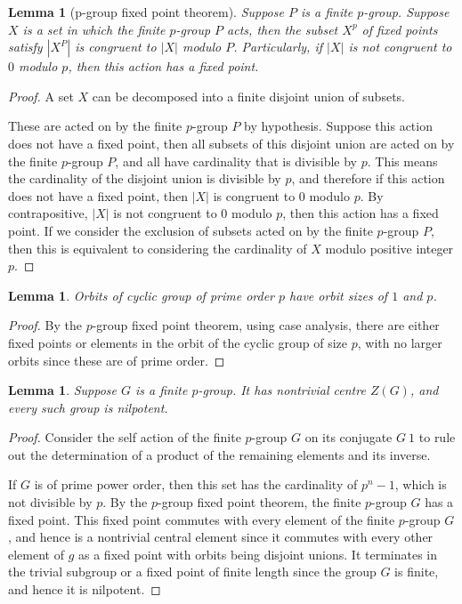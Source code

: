 \documentclass{tufte-book}
\newtheorem{lemma}[theorem]{Lemma}
\begin{document}
\begin{lemma}[p-group fixed point theorem]\label{lem:p-group-fixed-point-theorem}
  Suppose $P$ is a finite $p$-group.
  Suppose $X$ is a set in which the finite $p$-group $P$ acts, then the subset $X^{p}$ of fixed points satisfy $|X^P|$ is congruent to $|X|$ modulo $P$. Particularly, if $|X|$ is not congruent to $0$ modulo $p$, then this action has a fixed point. 
\end{lemma}

\begin{proof}
  A set $X$ can be decomposed into a finite disjoint union of subsets.

  These are acted on by the finite $p$-group $P$ by hypothesis. Suppose this action does not have a fixed point, then all subsets of this disjoint union are acted on by the finite $p$-group $P$, and all have cardinality that is divisible by $p$. This means the cardinality of the disjoint union is divisible by $p$, and therefore if this action does not have a fixed point, then $|X|$ is congruent to $0$ modulo $p$. By contrapositive, $|X|$ is not congruent to $0$ modulo $p$, then this action has a fixed point.
  If we consider the exclusion of subsets acted on by the finite $p$-group $P$, then this is equivalent to considering the cardinality of $X$ modulo positive integer $p$.
\end{proof}

\begin{lemma}
  Orbits of cyclic group of prime order $p$ have orbit sizes of $1$ and $p$.
\end{lemma}

\begin{proof}
  By the $p$-group fixed point theorem, using case analysis, there are either fixed points or elements in the orbit of the cyclic group of size $p$, with no larger orbits since these are of prime order.
\end{proof}

\begin{lemma}
  Suppose $G$ is a finite $p$-group. It has nontrivial centre $Z(G)$, and every such group is nilpotent.
\end{lemma}

\begin{proof}
  Consider the self action of the finite $p$-group $G$ on its conjugate $G \ {1}$ to rule out the determination of a product of the remaining elements and its inverse.

  If $G$ is of prime power order, then this set has the cardinality of $p^n - 1$, which is not divisible by $p$. By the $p$-group fixed point theorem, the finite $p$-group $G$ has a fixed point. This fixed point commutes with every element of the finite $p$-group $G$, and hence is a nontrivial central element since it commutes with every other element of $g$ as a fixed point with orbits being disjoint unions. It terminates in the trivial subgroup or a fixed point of finite length since the group $G$ is finite, and hence it is nilpotent.
\end{proof}
\end{document}
